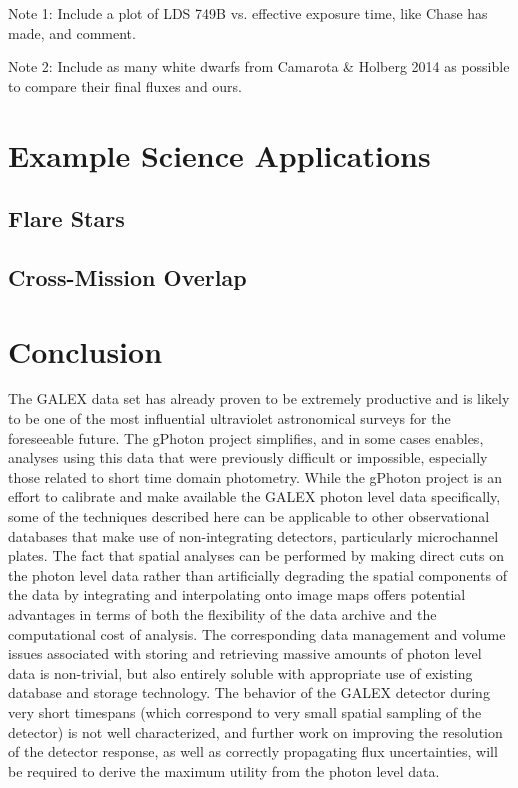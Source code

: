 \documentclass[preprint]{aastex}
\begin{document}
{\color{red}Note 1: Include a plot of LDS 749B vs. effective exposure time, like Chase has made, and comment.}

{\color{red}Note 2: Include as many white dwarfs from Camarota \& Holberg 2014 as possible to compare their final fluxes and ours.}

\section{Example Science Applications}
\label{scienceexamples}

\subsection{Flare Stars}

\subsection{Cross-Mission Overlap}

\section{Conclusion}
The GALEX data set has already proven to be extremely productive and is likely to be one of the most influential ultraviolet astronomical surveys for the foreseeable future. The gPhoton project simplifies, and in some cases enables, analyses using this data that were previously difficult or impossible, especially those related to short time domain photometry. While the gPhoton project is an effort to calibrate and make available the GALEX photon level data specifically, some of the techniques described here can be applicable to other observational databases that make use of non-integrating detectors, particularly microchannel plates. The fact that spatial analyses can be performed by making direct cuts on the photon level data rather than artificially degrading the spatial components of the data by integrating and interpolating onto image maps offers potential advantages in terms of both the flexibility of the data archive and the computational cost of analysis. The corresponding data management and volume issues associated with storing and retrieving massive amounts of photon level data is non-trivial, but also entirely soluble with appropriate use of existing database and storage technology. The behavior of the GALEX detector during very short timespans (which correspond to very small spatial sampling of the detector) is not well characterized, and further work on improving the resolution of the detector response, as well as correctly propagating flux uncertainties, will be required to derive the maximum utility from the photon level data.
\end{document}
